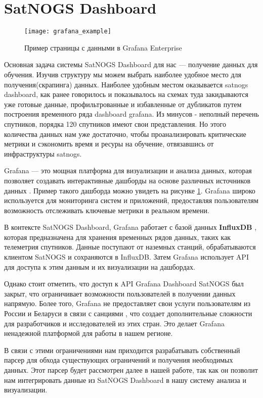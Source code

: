 \section{SatNOGS Dashboard}

\begin{figure}[htbp]
	\centering
	\texttt{[image: grafana\_example]}
	\caption{Пример страницы с данными в Grafana Enterprise}
	\label{fig:grafana_example}
\end{figure}

Основная задача системы SatNOGS Dashboard для нас — получение данных для
обучения. Изучив структуру мы можем выбрать наиболее удобное место для
получения(скрапинга) данных. Наиболее удобным местом оказывается satnogs
dashboard, как ранее говорилось и показывалось на схемах туда закидываются уже
готовые данные, профильтрованные и избавленные от дубликатов путем построения
временного ряда dashboard grafana. Из минусов - неполный перечень спутников,
порядка 120 спутников имеют свои представления. Но этого количества данных нам
уже достаточно, чтобы проанализировать критические метрики и сэкономить время и
ресуры на обучение, отвязавшись от инфраструктуры satnogs.


Grafana — это мощная платформа для визуализации и анализа данных, которая
позволяет создавать интерактивные дашборды на основе различных источников
данных \cite{grafana_docs}. Пример такого дашборда можно увидеть на рисунке
\ref{fig:grafana_example}.
Grafana широко используется для мониторинга систем и приложений, предоставляя
пользователям возможность отслеживать ключевые метрики в реальном времени.

В контексте SatNOGS Dashboard, Grafana работает с базой данных
\textbf{InfluxDB} \cite{influxdb_docs}, которая предназначена для хранения
временных рядов данных, таких как телеметрия спутников. Данные поступают от
наземных станций, обрабатываются клиентом SatNOGS и сохраняются в InfluxDB.
Затем Grafana использует API для доступа к этим данным и их визуализации на
дашбордах.

Однако стоит отметить, что доступ к API Grafana Dashboard SatNOGS был закрыт,
что ограничивает возможности пользователей в получении данных напрямую. Более
того, Grafana не предоставляет свои услуги пользователям из России и Беларуси в
связи с санциями \cite{grafana_community_post}, что создает дополнительные
сложности для разработчиков и исследователей из этих стран. Это делает Grafana
ненадежной платформой для работы в нашем регионе.

В связи с этими ограничениями нам приходится разрабатывать собственный парсер
для обхода существующих ограничений и получения необходимых данных. Этот парсер
будет рассмотрен далее в нашей работе, так как он позволит нам интегрировать
данные из SatNOGS Dashboard в нашу систему анализа и визуализации.

